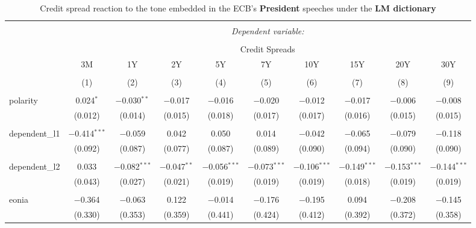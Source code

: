 
\begin{table}[!htbp] \centering 
  \caption[LM Tone \& Credit Spread: president speeches]{Credit spread reaction to the tone embedded in the ECB's \textbf{President} speeches under the \textbf{LM dictionary}} 
  \label{tab:spreads_president_lm} 
  \begin{adjustbox}{width=1.25\textwidth}
\begin{tabular}{@{\extracolsep{5pt}}lccccccccc} 
\\[-1.8ex]\hline 
\hline \\[-1.8ex] 
 & \multicolumn{9}{c}{\textit{Dependent variable:}} \\ 
\cline{2-10} 
\\[-1.8ex] & \multicolumn{9}{c}{Credit Spreads} \\ 
 & 3M & 1Y & 2Y & 5Y & 7Y & 10Y & 15Y & 20Y & 30Y \\ 
\\[-1.8ex] & (1) & (2) & (3) & (4) & (5) & (6) & (7) & (8) & (9)\\ 
\hline \\[-1.8ex] 
 polarity & 0.024$^{*}$ & $-$0.030$^{**}$ & $-$0.017 & $-$0.016 & $-$0.020 & $-$0.012 & $-$0.017 & $-$0.006 & $-$0.008 \\ 
  & (0.012) & (0.014) & (0.015) & (0.018) & (0.017) & (0.017) & (0.016) & (0.015) & (0.015) \\ 
  & & & & & & & & & \\ 
 dependent\_l1 & $-$0.414$^{***}$ & $-$0.059 & 0.042 & 0.050 & 0.014 & $-$0.042 & $-$0.065 & $-$0.079 & $-$0.118 \\ 
  & (0.092) & (0.087) & (0.077) & (0.087) & (0.089) & (0.090) & (0.094) & (0.090) & (0.090) \\ 
  & & & & & & & & & \\ 
 dependent\_l2 & 0.033 & $-$0.082$^{***}$ & $-$0.047$^{**}$ & $-$0.056$^{***}$ & $-$0.073$^{***}$ & $-$0.106$^{***}$ & $-$0.149$^{***}$ & $-$0.153$^{***}$ & $-$0.144$^{***}$ \\ 
  & (0.043) & (0.027) & (0.021) & (0.019) & (0.019) & (0.019) & (0.018) & (0.019) & (0.019) \\ 
  & & & & & & & & & \\ 
 eonia & $-$0.364 & $-$0.063 & 0.122 & $-$0.014 & $-$0.176 & $-$0.195 & 0.094 & $-$0.208 & $-$0.145 \\ 
  & (0.330) & (0.353) & (0.359) & (0.441) & (0.424) & (0.412) & (0.392) & (0.372) & (0.358) \\ 

\end{tabular}
\end{adjustbox}
\end{table}
